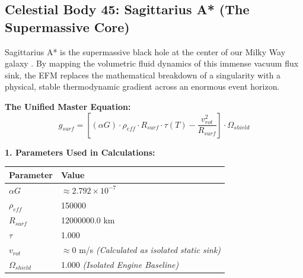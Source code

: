\documentclass[11pt, a4paper]{article}
\begin{document}
\clearpage
\subsection{Celestial Body 45: Sagittarius A* (The Supermassive Core)}
  Sagittarius A* is the supermassive black hole at the center of our Milky Way galaxy \cite{eht2022}. By mapping the volumetric fluid dynamics of this immense vacuum flux sink, the EFM replaces the mathematical breakdown of a singularity with a physical, stable thermodynamic gradient across an enormous event horizon.

  \vspace{0.5em}
  \noindent \textbf{The Unified Master Equation:}
  $$ g_{surf} = \left[ (\alpha G) \cdot \rho_{eff} \cdot R_{surf} \cdot \tau(T) - \frac{v_{rot}^2}{R_{surf}} \right] \cdot \Omega_{shield} $$

  \vspace{0.5em}
  \noindent \textbf{1. Parameters Used in Calculations:} \\[0.5em]
  \begingroup
  \renewcommand{\arraystretch}{1.3}
  \hspace*{2em}
  \begin{tabular}{|l|l|}
    \hline
    \textbf{Parameter} & \textbf{Value} \\ \hline
    $\alpha G$ & $\approx 2.792 \times 10^{-7}$ \\ \hline
    $\rho_{eff}$ & 150000 \\ \hline
    $R_{surf}$ & 12000000.0 km \\ \hline
    $\tau$ & 1.000 \\ \hline
    $v_{rot}$ & $\approx 0$ m/s \textit{(Calculated as isolated static sink)} \\ \hline
    $\Omega_{shield}$ & 1.000 \textit{(Isolated Engine Baseline)} \\ \hline
  \end{tabular}
  \endgroup
\end{document}
